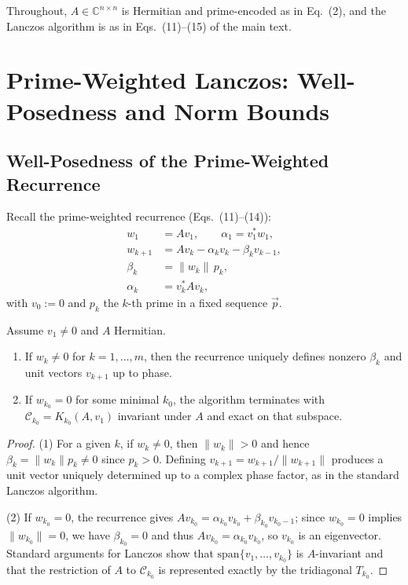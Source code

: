 \documentclass[11pt]{article}
\begin{document}
Throughout, $A\in\mathbb{C}^{n\times n}$ is Hermitian and prime-encoded
as in Eq.~(2), and the Lanczos algorithm is as in Eqs.~(11)--(15) of
the main text.\cite{PrimeEigenSolvers,LanczosTour,UrschelLanczos}

\section{Prime-Weighted Lanczos: Well-Posedness and Norm Bounds}

\subsection{Well-Posedness of the Prime-Weighted Recurrence}

Recall the prime-weighted recurrence (Eqs.~(11)--(14)):
\begin{align}
w_1 &= A v_1, \qquad \alpha_1 = v_1^* w_1, \\
w_{k+1} &= A v_k - \alpha_k v_k - \beta_k v_{k-1}, \label{eq:app-lanczos-rec}\\
\beta_k &= \|w_k\|\, p_k, \label{eq:app-beta}\\
\alpha_k &= v_k^* A v_k,
\end{align}
with $v_0:=0$ and $p_k$ the $k$-th prime in a fixed sequence
$\vec{p}$.\cite{PrimeEigenSolvers}

\begin{lemma}
Assume $v_1\neq 0$ and $A$ Hermitian.
\begin{enumerate}
  \item If $w_k\neq 0$ for $k=1,\dots,m$, then the recurrence uniquely
    defines nonzero $\beta_k$ and unit vectors $v_{k+1}$ up to phase.
  \item If $w_{k_0}=0$ for some minimal $k_0$, the algorithm terminates
    with $\mathcal{C}_{k_0}=K_{k_0}(A,v_1)$ invariant under $A$ and
    exact on that subspace.
\end{enumerate}
\end{lemma}

\begin{proof}
(1) For a given $k$, if $w_k\neq 0$, then $\|w_k\|>0$ and hence
$\beta_k = \|w_k\| p_k \neq 0$ since $p_k>0$. Defining
$v_{k+1} = w_{k+1}/\|w_{k+1}\|$ produces a unit vector uniquely
determined up to a complex phase factor, as in the standard Lanczos
algorithm.\cite{LanczosTour,BerkeleyLanczos}

(2) If $w_{k_0}=0$, the recurrence gives $A v_{k_0} = \alpha_{k_0}
v_{k_0} + \beta_{k_0} v_{k_0-1}$; since $w_{k_0}=0$ implies
$\|w_{k_0}\|=0$, we have $\beta_{k_0}=0$ and thus
$A v_{k_0} = \alpha_{k_0} v_{k_0}$, so $v_{k_0}$ is an eigenvector.
Standard arguments for Lanczos show that
$\mathrm{span}\{v_1,\dots,v_{k_0}\}$ is $A$-invariant and that the
restriction of $A$ to $\mathcal{C}_{k_0}$ is represented exactly by
the tridiagonal $T_{k_0}$.\cite{LanczosTour,UrschelLanczos}
\end{proof}
\end{document}
